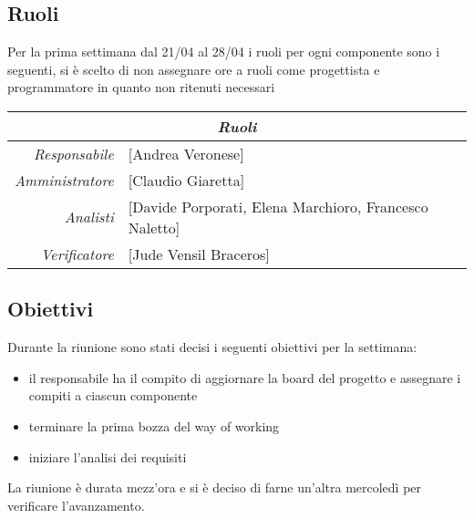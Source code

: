 \documentclass[12pt]{article}
\begin{document}
\subsection{Ruoli}
Per la prima settimana dal 21/04 al 28/04 i ruoli per ogni componente sono i seguenti, si è scelto di non assegnare ore a ruoli come progettista e programmatore in quanto non ritenuti necessari
\\
\begin{tabular}{r | l}
    \multicolumn{2}{c}{\textit{Ruoli}}\\
    \hline
        \textit{Responsabile} &
        [Andrea Veronese]\makecell{}\\
        \textit{Amministratore} &
        [Claudio Giaretta]\makecell{}\\
        \textit{Analisti} &
        [Davide Porporati, Elena Marchioro, Francesco Naletto]\makecell{}\\
        \textit{Verificatore} & 
        [Jude Vensil Braceros]\makecell{}\\
\end{tabular}
\subsection{Obiettivi}
Durante la riunione sono stati decisi i seguenti obiettivi per la settimana:
\begin{itemize}
    \item il responsabile ha il compito di aggiornare la board del progetto e assegnare i compiti a ciascun componente
    \item terminare la prima bozza del way of working
    \item iniziare l'analisi dei requisiti
\end{itemize}
La riunione è durata mezz'ora e si è deciso di farne un'altra mercoledì per verificare l'avanzamento.
\end{document}
